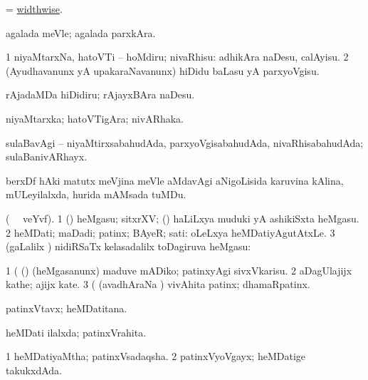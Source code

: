 \bentry
{}
\gl{\kirxvi}
\bmng
= \hyperlink{widthwise}{widthwise}. 
\emng
\eentry

\bentry
{}
\gl{\kirxvi}
\bmng
agalada meVle; agalada parxkAra. 
\emng
\eentry

\bentry
{}
\gl{\sakirx}
\bmng
\bnum
\num{1} niyaMtarxNa, hatoVTi -- hoMdiru; nivaRhisu:  adhikAra naDesu, calAyisu. 
\num{2} (Ayudhavanunx yA upakaraNavanunx) hiDidu baLasu yA parxyoVgisu. 
\enum
\emng

\noindent 
\gl{\pagu}
\bmng
{} rAjadaMDa hiDidiru; rAjayxBAra naDesu. 
\emng
\eentry

\bentry
{}
\gl{\nA}
\bmng
niyaMtarxka; hatoVTigAra; nivARhaka. 
\emng
\eentry

\bentry
{} 
\gl{\gu}
\bmng
sulaBavAgi -- niyaMtirxsabahudAda, parxyoVgisabahudAda, nivaRhisabahudAda; sulaBanivARhayx. 
\emng
\eentry

\bentry
{}
\gl{\nA}
\bmng
berxDf hAki matutx meVjina meVle aMdavAgi aNigoLisida karuvina kAlina, mULeyilalxda, hurida mAMsada tuMDu. 
\emng
\eentry

\bentry
{} 
\gl{\nA} (\bava\  \ucAcx\ veYvf).
\bmng
\bnum
\num{1} (\pArxparx) heMgasu; sitxrXV; (\kanmu) haLiLxya muduki yA ashikiSxta heMgasu. 
\num{2} heMDati; maDadi; patinx; BAyeR; sati:  oLeLxya heMDatiyAgutAtxLe. 
\num{3} (\saMpa gaLalilx \parx) nidiRSaTx kelasadalilx toDagiruva heMgasu:  
\enum
\emng

\noindent 
\gl{\pagu}
\bmng
\bnum
\num{1}  (  (\pArxparx) (heMgasanunx) maduve mADiko; patinxyAgi sivxVkarisu. 
\num{2}  aDagUlajijx kathe; ajijx kate. 
\num{3}  (  (avadhAraNa \parx) vivAhita patinx; dhamaRpatinx. 
\enum
\emng
\eentry

\bentry
{}
\gl{\nA}
\bmng
patinxVtavx; heMDatitana. 
\emng
\eentry

\bentry
{}
\gl{\gu}
\bmng
heMDati ilalxda; patinxVrahita. 
\emng
\eentry

\bentry
{} 
\gl{\gu}
\expl{}
\bmng
\bnum
\num{1} heMDatiyaMtha; patinxVsadaqsha. 
\num{2} patinxVyoVgayx; heMDatige takukxdAda. 
\enum
\emng
\eentry

